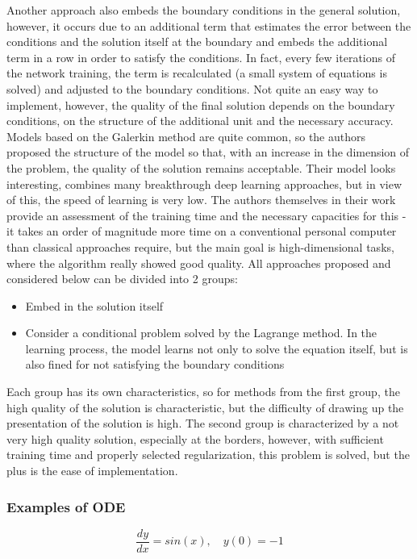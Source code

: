 Another approach \cite{cao2016locally} also embeds the boundary conditions in the general solution, however, it occurs due to an additional term that estimates the error between the conditions and the solution itself at the boundary and embeds the additional term in a row in order to satisfy the conditions. In fact, every few iterations of the network training, the term is recalculated (a small system of equations is solved) and adjusted to the boundary conditions. Not quite an easy way to implement, however, the quality of the final solution depends on the boundary conditions, on the structure of the additional unit and the necessary accuracy. Models based on the Galerkin method are quite common, so the authors \cite{Sirignano_2018} proposed the structure of the model so that, with an increase in the dimension of the problem, the quality of the solution remains acceptable. Their model looks interesting, combines many breakthrough deep learning approaches, but in view of this, the speed of learning is very low. The authors themselves in their work provide an assessment of the training time and the necessary capacities for this - it takes an order of magnitude more time on a conventional personal computer than classical approaches require, but the main goal is high-dimensional tasks, where the algorithm really showed good quality. All approaches proposed and considered below can be divided into 2 groups: 
\begin{itemize}
	\item Embed in the solution itself \cite{Lagaris_1998} \cite{liu2019solving} \cite{cao2016locally}
	\item Consider a conditional problem solved by the Lagrange method. In the learning process, the model learns not only to solve the equation itself, but is also fined for not satisfying the boundary conditions \cite{Pun_2019}
\end{itemize}
Each group has its own characteristics, so for methods from the first group, the high quality of the solution is characteristic, but the difficulty of drawing up the presentation of the solution is high. The second group is characterized by a not very high quality solution, especially at the borders, however, with sufficient training time and properly selected regularization, this problem is solved, but the plus is the ease of implementation.

\subsubsection{Examples of ODE}
\begin{equation*}
	\dfrac{d y}{d x} = sin(x), \quad y(0) = -1
\end{equation*}

